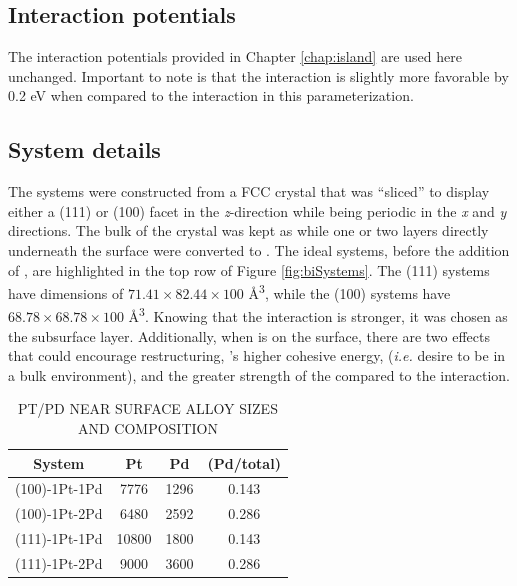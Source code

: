 \subsection{Interaction potentials}
The interaction potentials provided in Chapter \ref{chap:island} are used here unchanged.
\citep{Michalka:2015aa} Important to note is that
the  interaction is slightly more favorable by 0.2 eV 
when compared to the  interaction in this parameterization.

\subsection{System details}
The systems were constructed from a FCC  crystal that was ``sliced'' to
display either a (111) or (100) facet in the {\em z}-direction while being
periodic in the {\em x} and {\em y} directions. The bulk of the crystal was
kept as  while one or two layers directly underneath the surface were
converted to . The ideal systems, before the addition of , are
highlighted in the top row of Figure \ref{fig:biSystems}. The (111) systems
have dimensions of $71.41\times82.44\times100$ \AA\textsuperscript{3}, while
the (100) systems have $68.78\times68.78\times100$ \AA\textsuperscript{3}.
Knowing that the  interaction is stronger, it was chosen as
the subsurface layer. Additionally, when  is on the surface, there are
two effects that could encourage restructuring, 's higher cohesive
energy, ({\em i.e.} desire to be in a bulk environment), and the greater
strength of the  compared to the 
interaction.

\begin{table}
  \caption{PT/PD NEAR SURFACE ALLOY SIZES AND COMPOSITION}
  \centering
  \begin{threeparttable}
  \begin{tabular}{ c ccc }
  \hline
  \hline
  \textbf{System} & \textbf{Pt} & \textbf{Pd} &  \textbf{(Pd/total)} \\
  \hline
  (100)-1Pt-1Pd & 7776 & 1296  & 0.143 \\
  (100)-1Pt-2Pd & 6480  & 2592  & 0.286 \\
  (111)-1Pt-1Pd & 10800  & 1800  & 0.143 \\
  (111)-1Pt-2Pd & 9000 & 3600  & 0.286 \\
  \hline
  \hline
  \end{tabular}
  \end{threeparttable}
\label{tab:systems1}
\end{table}


